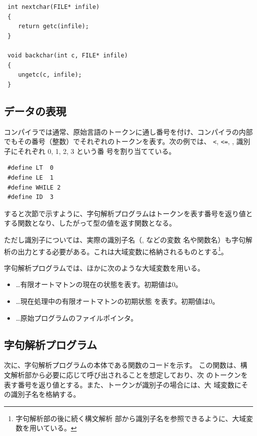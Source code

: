 \begin{lstlisting}
 int nextchar(FILE* infile)
 {
    return getc(infile);
 }

 void backchar(int c, FILE* infile)
 {
    ungetc(c, infile);
 }
\end{lstlisting}

\subsection{データの表現}

コンパイラでは通常、原始言語のトークンに通し番号を付け、コンパイラの内部
でもその番号（整数）でそれぞれのトークンを表す。次の例では、
\verb|<|, \verb|<=|, , 識別子にそれぞれ 0, 1, 2, 3 という番
号を割り当てている。

\begin{lstlisting}
 #define LT  0
 #define LE  1
 #define WHILE 2
 #define ID  3
\end{lstlisting}

すると次節で示すように、字句解析プログラムはトークンを表す番号を返り値と
する関数となり、したがって型の値を返す関数となる。

ただし識別子については、実際の識別子名（, などの変数
名や関数名）も字句解析の出力とする必要がある。これは大域変数に格納されるものとする\footnote{字句解析部の後に続く構文解析
部から識別子名を参照できるように、大域変数を用いている。}。

字句解析プログラムでは、ほかに次のような大域変数を用いる。
\begin{itemize}
 \item {}…有限オートマトンの現在の状態を表す。初期値は0。
 \item {}…現在処理中の有限オートマトンの初期状態
       を表す。初期値は0。
 \item {}…原始プログラムのファイルポインタ。
\end{itemize}

\subsection{字句解析プログラム}

次に、字句解析プログラムの本体である関数のコードを示す。
この関数は、構文解析部から必要に応じて呼び出されることを想定しており、次
のトークンを表す番号を返り値とする。また、トークンが識別子の場合には、大
域変数にその識別子名を格納する。

